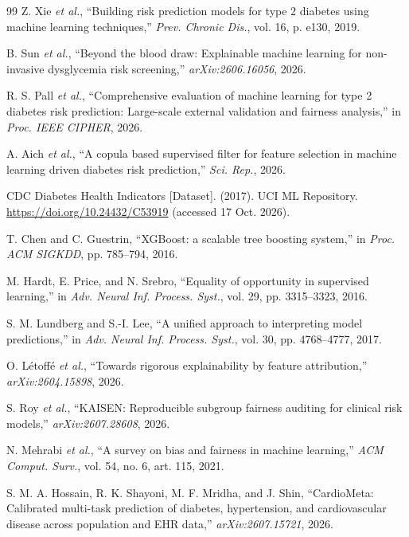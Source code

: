 \documentclass[conference]{IEEEtran}
\begin{document}
\begin{thebibliography}{99}
Z. Xie \textit{et al.}, ``Building risk prediction models for type 2 diabetes using machine learning techniques,'' \textit{Prev. Chronic Dis.}, vol. 16, p. e130, 2019.

B. Sun \textit{et al.}, ``Beyond the blood draw: Explainable machine learning for non-invasive dysglycemia risk screening,'' \textit{arXiv:2606.16056}, 2026.

R. S. Pall \textit{et al.}, ``Comprehensive evaluation of machine learning for type 2 diabetes risk prediction: Large-scale external validation and fairness analysis,'' in \textit{Proc. IEEE CIPHER}, 2026.

A. Aich \textit{et al.}, ``A copula based supervised filter for feature selection in machine learning driven diabetes risk prediction,'' \textit{Sci. Rep.}, 2026.

CDC Diabetes Health Indicators [Dataset]. (2017). UCI ML Repository. \url{https://doi.org/10.24432/C53919} (accessed 17 Oct. 2026).

T. Chen and C. Guestrin, ``XGBoost: a scalable tree boosting system,'' in \textit{Proc. ACM SIGKDD}, pp. 785--794, 2016.

M. Hardt, E. Price, and N. Srebro, ``Equality of opportunity in supervised learning,'' in \textit{Adv. Neural Inf. Process. Syst.}, vol. 29, pp. 3315--3323, 2016.

S. M. Lundberg and S.-I. Lee, ``A unified approach to interpreting model predictions,'' in \textit{Adv. Neural Inf. Process. Syst.}, vol. 30, pp. 4768--4777, 2017.

O. L\'etoff\'e \textit{et al.}, ``Towards rigorous explainability by feature attribution,'' \textit{arXiv:2604.15898}, 2026.

S. Roy \textit{et al.}, ``KAISEN: Reproducible subgroup fairness auditing for clinical risk models,'' \textit{arXiv:2607.28608}, 2026.

N. Mehrabi \textit{et al.}, ``A survey on bias and fairness in machine learning,'' \textit{ACM Comput. Surv.}, vol. 54, no. 6, art. 115, 2021.

S. M. A. Hossain, R. K. Shayoni, M. F. Mridha, and J. Shin, ``CardioMeta: Calibrated multi-task prediction of diabetes, hypertension, and cardiovascular disease across population and EHR data,'' \textit{arXiv:2607.15721}, 2026.


\end{thebibliography}
\end{document}
